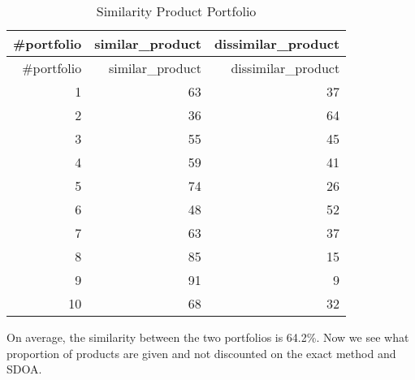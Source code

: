 \documentclass[preprint, 3p,
authoryear]{elsarticle} %
\begin{document}
\begin{longtable}[]{@{}rrr@{}}
\caption{Similarity Product Portfolio}\tabularnewline
\toprule()
\#portfolio & similar\_product & dissimilar\_product \\
\midrule()
\endfirsthead
\toprule()
\#portfolio & similar\_product & dissimilar\_product \\
\midrule()
\endhead
1 & 63 & 37 \\
2 & 36 & 64 \\
3 & 55 & 45 \\
4 & 59 & 41 \\
5 & 74 & 26 \\
6 & 48 & 52 \\
7 & 63 & 37 \\
8 & 85 & 15 \\
9 & 91 & 9 \\
10 & 68 & 32 \\
\bottomrule()
\end{longtable}

On average, the similarity between the two portfolios is 64.2\%. Now we
see what proportion of products are given and not discounted on the
exact method and SDOA.
\end{document}
